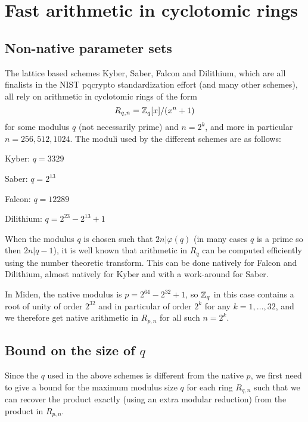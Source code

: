 \section{Fast arithmetic in cyclotomic rings}

\subsection{Non-native parameter sets}

The lattice based schemes Kyber, Saber, Falcon and Dilithium, which are all finalists in the NIST pqcrypto standardization
effort (and many other schemes), all rely on arithmetic in cyclotomic rings of the form
\[  R_{q,n} = \mathbb{Z}_q[x]/(x^n + 1)    \]
for some modulus $q$ (not necessarily prime) and $n = 2^k$, and more in particular $n = 256, 512, 1024$.
The moduli used by the different schemes are as follows:
\bit
\item Kyber: $q = 3329$
\item Saber: $q = 2^{13}$
\item Falcon: $q = 12289$
\item Dilithium: $q = 2^{23} - 2^{13} + 1$
\eit

When the modulus $q$ is chosen such that $2n | \varphi(q)$ (in many cases $q$ is a prime so then $2n | q-1$), 
it is well known that arithmetic in $R_q$ can be computed efficiently using the number theoretic transform.
This can be done natively for Falcon and Dilithium, almost natively for Kyber and with a work-around for Saber.

In Miden, the native modulus is $p = 2^{64} - 2^{32} + 1$, so $\mathbb{Z}_q$ in this case contains a root of unity 
of order $2^{32}$ and in particular of order $2^k$ for any $k = 1, \ldots, 32$, and we therefore get native
arithmetic in $R_{p,n}$ for all such $n = 2^k$.

\subsection{Bound on the size of $q$}

Since the $q$ used in the above schemes is different from the native $p$, we first need to give a bound for
the maximum modulus size $q$ for each ring $R_{q,n}$ such that we can recover the product exactly (using 
an extra modular reduction) from the product in $R_{p,n}$.

